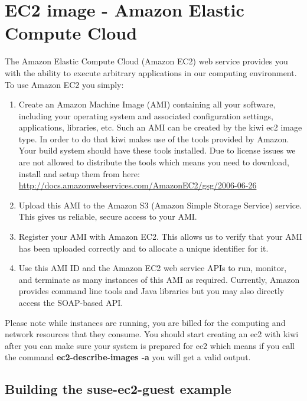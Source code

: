 \chapter{EC2 image - Amazon Elastic Compute Cloud}
\label{chapter:ec2}
\minitoc

The Amazon Elastic Compute Cloud (Amazon EC2) web service provides you
with the ability to execute arbitrary applications in our computing
environment. To use Amazon EC2 you simply:

\begin{enumerate}
\item Create an Amazon Machine Image (AMI) containing all your software,
      including your operating system and associated configuration settings,
      applications, libraries, etc. Such an AMI can be created by the kiwi
      ec2 image type. In order to do that kiwi makes use of the tools
      provided by Amazon. Your build system should have these tools
      installed. Due to license issues we are not allowed to distribute
      the tools which means you need to download, install and setup
      them from here:\\
      \url{http://docs.amazonwebservices.com/AmazonEC2/gsg/2006-06-26}
\item Upload this AMI to the Amazon S3 (Amazon Simple Storage Service)
      service. This gives us reliable, secure access to your AMI.
\item Register your AMI with Amazon EC2. This allows us to verify that your
      AMI has been uploaded correctly and to allocate a unique identifier
      for it.
\item Use this AMI ID and the Amazon EC2 web service APIs to run, monitor,
      and terminate as many instances of this AMI as required. Currently,
      Amazon provides command line tools and Java libraries but you may also
      directly access the SOAP-based API.
\end{enumerate}

Please note while instances are running, you are billed for the
computing and network resources that they consume.
You should start creating an ec2 with kiwi after you can make sure
your system is prepared for ec2 which means if you call the command
\textbf{ec2-describe-images -a} you will get a valid output.

\section{Building the suse-ec2-guest example}

